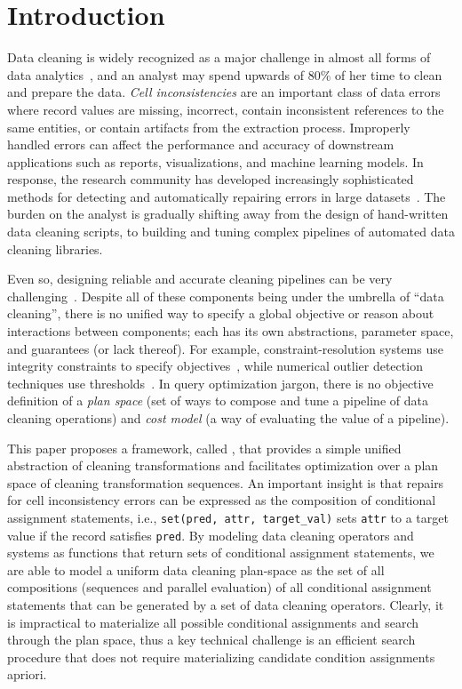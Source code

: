 \section{Introduction}\label{intro}\sloppy
Data cleaning is widely recognized as a major challenge in almost all forms of data analytics~\cite{nytimes}, and an analyst may spend upwards of 80\% of her time to clean and prepare the data. 
\emph{Cell inconsistencies} are an important class of data errors where record values are missing, incorrect, contain inconsistent references to the same entities, or contain artifacts from the extraction process.  
Improperly handled errors can affect the performance and accuracy of downstream applications such as reports, visualizations, and machine learning models.
In response, the research community has developed increasingly sophisticated methods for detecting and automatically repairing errors in large datasets~\cite{dc, rekatsinas2017holoclean, DBLP:journals/pvldb/KrishnanWWFG16, DBLP:conf/sigmod/ChuIKW16, mudgal2018deep, doan2018toward}.
The burden on the analyst is gradually shifting away from the design of hand-written data cleaning scripts, to building and tuning complex pipelines of automated data cleaning libraries.

Even so, designing reliable and accurate cleaning pipelines can be very challenging~\cite{krishnan2016hilda}.
Despite all of these components being under the umbrella of ``data cleaning'', there is no unified way to specify a global objective or reason about interactions between components; each has its own abstractions, parameter space, and guarantees (or lack thereof).
For example, constraint-resolution systems use integrity constraints to specify objectives~\cite{rekatsinas2017holoclean,DBLP:conf/sigmod/ChuIKW16}, while numerical outlier detection techniques use thresholds~\cite{bailis2016macrobase}.
In query optimization jargon, there is no objective definition of a \emph{plan space} (set of ways to compose and tune a pipeline of data cleaning operations) and \emph{cost model} (a way of evaluating the value of a pipeline).

This paper proposes a framework, called \sys, that provides a simple unified abstraction of cleaning transformations and facilitates optimization over a plan space of cleaning transformation sequences.
An important insight is that repairs for cell inconsistency errors can be expressed as the composition of conditional assignment statements, i.e., \texttt{set(pred, attr, target\_val)} sets \texttt{attr} to a target value if the record satisfies \texttt{pred}.  By modeling data cleaning operators and systems as functions that return sets of conditional assignment statements, we are able to model a uniform data cleaning plan-space as the set of all compositions (sequences and parallel evaluation) of all conditional assignment statements that can be generated by a set of data cleaning operators.  Clearly, it is impractical to materialize all possible conditional assignments and search through the plan space, thus a key technical challenge is an efficient search procedure that does not require materializing candidate condition assignments apriori.

